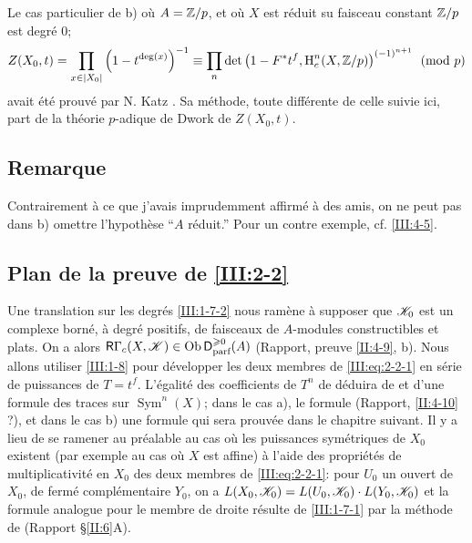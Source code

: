 Le cas particulier de b) o\`u $A=\mathbb{Z}/p$, et o\`u $X$ est r\'eduit su faisceau 
constant $\mathbb{Z}/p$ est degr\'e $0$;
\[
  Z(X_0,t) = \prod_{x\in |X_0|} \left(1-t^{\deg(x)}\right)^{-1}
      \equiv \prod_n \det\left(1-F^* t^f,\operatorname{H}_c^n(X,\mathbb{Z}/p)\right)^{(-1)^{n+1}} \pmod p
\]
avait \'et\'e prouv\'e par N. Katz \cite[XXII 3.1]{sga7}. Sa m\'ethode, toute 
diff\'erente de celle suivie ici, part de la th\'eorie $p$-adique de Dwork de 
$Z(X_0,t)$. 





\subsection{Remarque}\label{III:2-7}


Contrairement \`a ce que j'avais imprudemment affirm\'e \`a des amis, on ne 
peut pas dans b) omettre l'hypoth\`ese ``$A$ r\'eduit.'' Pour un contre 
exemple, cf. \ref{III:4-5}. 





\subsection{Plan de la preuve de \ref{III:2-2}}\label{III:2-8}

Une translation sur les degr\'es \ref{III:1-7-2} nous ram\`ene \`a supposer 
que $\mathscr{K}_0$ est un complexe born\'e, \`a degr\'e positifs, de faisceaux de 
$A$-modules constructibles et plats. On a alors 
$\mathsf{R}\Gamma_c(X,\mathscr{K})\in \operatorname{Ob}\mathsf{D}_\text{parf}^{\geqslant 0}(A)$ (Rapport, 
preuve \ref{II:4-9}, b). Nous allons utiliser \ref{III:1-8} pour d\'evelopper 
les deux membres de \eqref{III:eq:2-2-1} en s\'erie de puissances de $T=t^f$. 
L'\'egalit\'e des coefficients de $T^n$ de d\'eduira de 
\cite[XVII 5.5.21]{sga4} et d'une formule des traces sur 
$\operatorname{Sym}^n(X)$; dans le cas a), le formule (Rapport, 
\ref{II:4-10} ?), et dans le cas b) une formule qui sera prouv\'ee dans le 
chapitre suivant. Il y a lieu de se ramener au pr\'ealable au cas o\`u les 
puissances sym\'etriques de $X_0$ existent (par exemple au cas o\`u $X$ est 
affine) \`a l'aide des propri\'et\'es de multiplicativit\'e en $X_0$ des deux 
membres de \eqref{III:eq:2-2-1}: pour $U_0$ un ouvert de $X_0$, de ferm\'e 
compl\'ementaire $Y_0$, on a $L(X_0,\mathscr{K}_0)=L(U_0,\mathscr{K}_0)\cdot L(Y_0,\mathscr{K}_0)$ et 
la formule analogue pour le membre de droite r\'esulte de \ref{III:1-7-1} 
par la m\'ethode de (Rapport \S\ref{II:6}A). 





